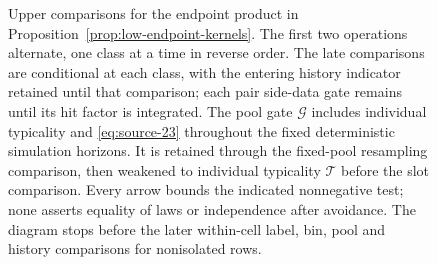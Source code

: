 \begin{figure}[tbp]
\caption{Upper comparisons for the endpoint product in
Proposition~\ref{prop:low-endpoint-kernels}.
The first two operations alternate, one class at a time in reverse order.
The late comparisons are conditional at each class, with the entering
history indicator retained until that comparison; each pair side-data
gate remains until its hit factor is integrated.
The pool gate \(\mathcal G\) includes individual typicality and
\eqref{eq:source-23} throughout the fixed deterministic simulation
horizons. It is retained through the fixed-pool resampling comparison,
then weakened to individual typicality \(\mathcal T\) before the slot
comparison. Every arrow bounds the indicated nonnegative test; none
asserts equality of laws or independence after avoidance.
The diagram stops before the later within-cell label, bin, pool and
history comparisons for nonisolated rows.}
\label{fig:endpoint-comparisons}
\end{figure}

